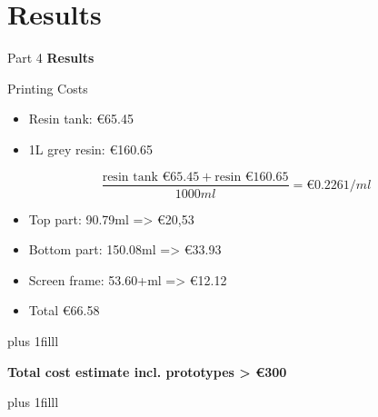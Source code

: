 \documentclass[t]{beamer}
\newcommand{\btVFill}{\vskip0pt plus 1filll}
\begin{document}
\section{Results}
\begin{frame}{Part 4}
    \Huge\textbf{Results}
\end{frame}

\begin{frame}{Printing Costs}
    \begin{itemize}
        \item Resin tank: €65.45
        \item 1L grey resin: €160.65
    \end{itemize}
    \vspace*{1em}
    \[\frac{\text{resin tank €}65.45 + \text{resin €}160.65}{1000 ml} = \text{€}0.2261/ml\]
    \begin{itemize}
        \item Top part: 90.79ml => €20,53
        \item Bottom part: 150.08ml => €33.93
        \item Screen frame: 53.60+ml => €12.12
        \item Total €66.58
    \end{itemize}
    \btVFill
    \begin{center}
        \textbf{Total cost estimate incl. prototypes > €300}
    \end{center}
    \btVFill
\end{frame}
\end{document}
